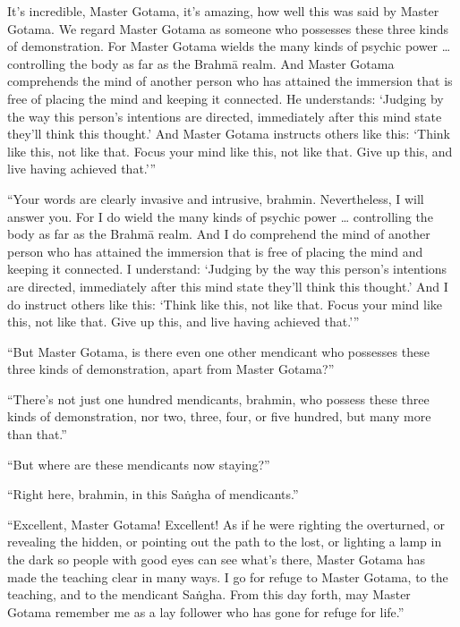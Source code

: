 \documentclass[12pt,openany]{book}%
\begin{document}
It’s incredible, Master Gotama, it’s amazing, how well this was said by Master Gotama. We regard Master Gotama as someone who possesses these three kinds of demonstration. For Master Gotama wields the many kinds of psychic power … controlling the body as far as the \textsanskrit{Brahmā} realm. And Master Gotama comprehends the mind of another person who has attained the immersion that is free of placing the mind and keeping it connected. He understands: ‘Judging by the way this person’s intentions are directed, immediately after this mind state they’ll think this thought.’ And Master Gotama instructs others like this: ‘Think like this, not like that. Focus your mind like this, not like that. Give up this, and live having achieved that.’” 

“Your words are clearly invasive and intrusive, brahmin. Nevertheless, I will answer you. For I do wield the many kinds of psychic power … controlling the body as far as the \textsanskrit{Brahmā} realm. And I do comprehend the mind of another person who has attained the immersion that is free of placing the mind and keeping it connected. I understand: ‘Judging by the way this person’s intentions are directed, immediately after this mind state they’ll think this thought.’ And I do instruct others like this: ‘Think like this, not like that. Focus your mind like this, not like that. Give up this, and live having achieved that.’” 

“But Master Gotama, is there even one other mendicant who possesses these three kinds of demonstration, apart from Master Gotama?” 

“There’s not just one hundred mendicants, brahmin, who possess these three kinds of demonstration, nor two, three, four, or five hundred, but many more than that.” 

“But where are these mendicants now staying?” 

“Right here, brahmin, in this \textsanskrit{Saṅgha} of mendicants.” 

“Excellent, Master Gotama! Excellent! As if he were righting the overturned, or revealing the hidden, or pointing out the path to the lost, or lighting a lamp in the dark so people with good eyes can see what’s there, Master Gotama has made the teaching clear in many ways. I go for refuge to Master Gotama, to the teaching, and to the mendicant \textsanskrit{Saṅgha}. From this day forth, may Master Gotama remember me as a lay follower who has gone for refuge for life.” 
\end{document}
